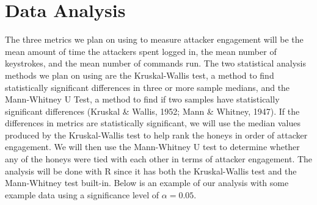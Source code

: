 \documentclass[12pt]{article}
\begin{document}
\section*{\normalsize{Data Analysis}}
\indent The three metrics we plan on using to measure attacker engagement will be the mean amount of time the attackers spent logged in, the mean number of keystrokes, and the mean number of commands run. \newline
\indent The two statistical analysis methods we plan on using are the Kruskal-Wallis test, a method to find statistically significant differences in three or more sample medians, and the Mann-Whitney U Test, a method to find if two samples have statistically significant differences (Kruskal \& Wallis, 1952; Mann \& Whitney, 1947). \newline
\indent If the differences in metrics are statistically significant, we will use the median values produced by the Kruskal-Wallis test to help rank the honeys in order of attacker engagement. We will then use the Mann-Whitney U test to determine whether any of the honeys were tied with each other in terms of attacker engagement. The analysis will be done with R since it has both the Kruskal-Wallis test and the Mann-Whitney test built-in. Below is an example of our analysis with some example data using a significance level of $\alpha=0.05$. \newline 
\end{document}

